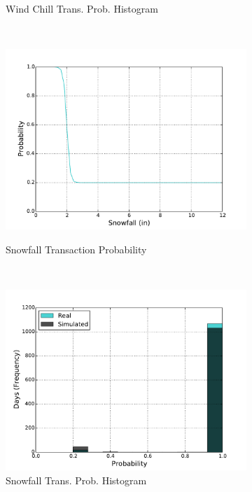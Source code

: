 \documentclass[11pt, letterpaper]{article}
\begin{document}
\begin{figure}[H]
\begin{subfigure}[b]{0.45\textwidth}
    \caption{Wind Chill Trans. Prob. Histogram}
  \end{subfigure}
  ~
  \begin{subfigure}[b]{0.45\textwidth}
    \includegraphics[width=\textwidth]{figures/snowfall_trans_prob.pdf}
    \label{fig:analysis-raw}
    \caption{Snowfall Transaction Probability}
  \end{subfigure}
  ~
  \begin{subfigure}[b]{0.45\textwidth}
    \includegraphics[width=\textwidth]{figures/snowfall_trans_prob_hist.pdf}
    \caption{Snowfall Trans. Prob. Histogram}
  \end{subfigure}
  ~
  \begin{subfigure}[b]{0.45\textwidth}

\end{subfigure}
\end{figure}
\end{document}
